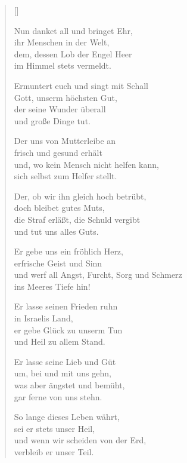 \begin{multicols}{2}
\settowidth{\versewidth}{Ermuntert euch und singt mit Schall}
\begin{verse}[\versewidth]

 Nun danket all und bringet Ehr,\\
ihr Menschen in der Welt,\\
dem, dessen Lob der Engel Heer\\
im Himmel stets vermeldt.

 Ermuntert euch und singt mit Schall\\
Gott, unserm höchsten Gut,\\
der seine Wunder überall\\
und große Dinge tut.

 Der uns von Mutterleibe an\\
frisch und gesund erhält\\
und, wo kein Mensch nicht helfen kann,\\
sich selbst zum Helfer stellt.

 Der, ob wir ihn gleich hoch betrübt,\\
doch bleibet gutes Muts,\\
die Straf erläßt, die Schuld vergibt\\
und tut uns alles Guts.

 Er gebe uns ein fröhlich Herz,\\
erfrische Geist und Sinn\\
und werf all Angst, Furcht, Sorg und Schmerz\\
ins Meeres Tiefe hin!

 Er lasse seinen Frieden ruhn\\
in Israelis Land,\\
er gebe Glück zu unserm Tun\\
und Heil zu allem Stand.

 Er lasse seine Lieb und Güt\\
um, bei und mit uns gehn,\\
was aber ängstet und bemüht,\\
gar ferne von uns stehn.

 So lange dieses Leben währt,\\
sei er stets unser Heil,\\
und wenn wir scheiden von der Erd,\\
verbleib er unser Teil.

\end{verse}
\end{multicols}

